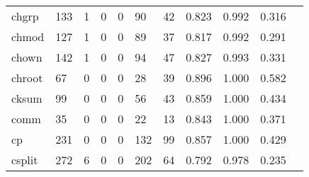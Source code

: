 \begin{longtable}{lp{1.10cm}p{1.10cm}p{1.10cm}p{1.10cm}p{1.10cm}p{1.10cm}p{1.10cm}p{1.10cm}p{1.10cm}p{1.10cm}}
chgrp     &                    133 &                                  1 &                                 0 &                                0 &                                90 &                              42 &                          0.823 &                                 0.992 &                               0.316 \\
chmod     &                    127 &                                  1 &                                 0 &                                0 &                                89 &                              37 &                          0.817 &                                 0.992 &                               0.291 \\
chown     &                    142 &                                  1 &                                 0 &                                0 &                                94 &                              47 &                          0.827 &                                 0.993 &                               0.331 \\
chroot    &                     67 &                                  0 &                                 0 &                                0 &                                28 &                              39 &                          0.896 &                                 1.000 &                               0.582 \\
cksum     &                     99 &                                  0 &                                 0 &                                0 &                                56 &                              43 &                          0.859 &                                 1.000 &                               0.434 \\
comm      &                     35 &                                  0 &                                 0 &                                0 &                                22 &                              13 &                          0.843 &                                 1.000 &                               0.371 \\
cp        &                    231 &                                  0 &                                 0 &                                0 &                               132 &                              99 &                          0.857 &                                 1.000 &                               0.429 \\
csplit    &                    272 &                                  6 &                                 0 &                                0 &                               202 &                              64 &                          0.792 &                                 0.978 &                               0.235 \\

\end{longtable}
